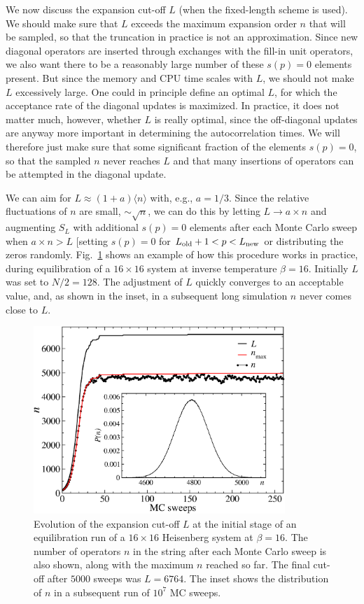 \documentclass[draft,numberedheadings]{aipproc}
\begin{document}
We now discuss the expansion cut-off $L$ (when the fixed-length scheme is used). We should make sure that $L$ exceeds the maximum expansion 
order $n$ that will be sampled, so that the truncation in practice is not an approximation. Since new diagonal operators are inserted through exchanges 
with the fill-in unit operators, we also want there to be a reasonably large number of these $s(p)=0$ elements present. But since the memory and CPU 
time scales with $L$, we should not make $L$ excessively large. One could in principle define an optimal $L$, for which the acceptance rate of the diagonal updates
is maximized. In practice, it does not matter much, however, whether $L$ is really optimal, since the off-diagonal updates are anyway more important in determining 
the autocorrelation times. We will therefore just make sure  that some significant fraction of the elements $s(p)=0$, so that the sampled $n$ never reaches 
$L$ and that many insertions of operators can be attempted in the diagonal update.

We can aim for $L \approx (1+a) \langle n\rangle$ with, e.g., $a=1/3$. Since the relative fluctuations of $n$ are small, $\sim \sqrt{n}$, we can 
do this by letting $L \to a\times n$ and augmenting $S_L$ with additional $s(p)=0$ elements after each Monte Carlo sweep when $a\times n>L$ [setting
$s(p)=0$ for $L_{\rm old}+1<p<L_{\rm new}$ or distributing the zeros randomly. Fig.~\ref{ncut} shows an example of how this procedure works in practice, 
during equilibration of a $16\times 16$ system at inverse temperature $\beta=16$. Initially $L$ was set to $N/2=128$. The adjustment of $L$ quickly 
converges to an acceptable value, and, as shown in the inset, in a subsequent long simulation $n$ never comes close to $L$.

\begin{figure}
\includegraphics[width=9.5cm, clip]{ncut.eps}
\caption{Evolution of the expansion cut-off $L$ at the initial stage of an equilibration run of a $16\times 16$ Heisenberg system at $\beta=16$. The number 
of operators $n$ in the string after each Monte Carlo sweep is also shown, along with the maximum $n$ reached so far. The final cut-off after $5000$ sweeps 
was $L=6764$. The inset shows the distribution of $n$ in a subsequent run of $10^{7}$ MC sweeps.}
\label{ncut}
\end{figure}
\end{document}
